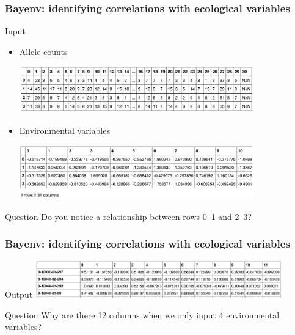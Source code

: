 \begin{frame}
\frametitle{Bayenv: identifying correlations with ecological
variables}
\begin{block}{Input}
\centering
\begin{itemize}
\item{Allele counts}
\begin{center}
\includegraphics[width=0.8\textwidth]{bayenv_in1.png}	
\end{center}

\item{Environmental variables}
\begin{center}
\includegraphics[width=0.8\textwidth]{bayenv_in2.png}	
\end{center}
\end{itemize}
\end{block}
\begin{block}{Question}
Do you notice a relationship between rows 0--1 and 2--3?
\end{block}

\end{frame}

\begin{frame}
\frametitle{Bayenv: identifying correlations with ecological
variables}
\begin{block}{Output}
\centering
\includegraphics[width=0.8\textwidth]{bayenv_out1.png}
\end{block}
\begin{block}{Question}
Why are there 12 columns when we only input 4 environmental variables?
\end{block}

\end{frame}

